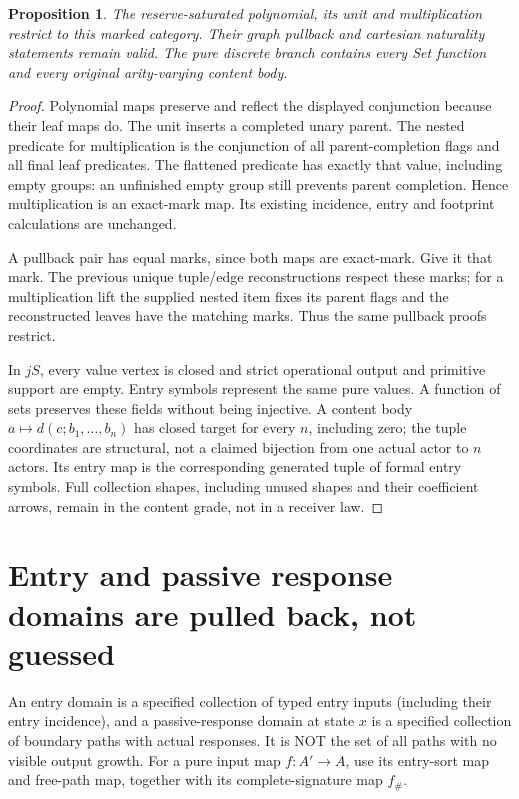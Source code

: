 \documentclass[11pt]{article}
\newtheorem{proposition}{Proposition}
\begin{document}
\begin{proposition}
The reserve-saturated polynomial, its unit and multiplication restrict to this marked category. Their graph pullback and cartesian naturality statements remain valid. The pure discrete branch contains every Set function and every original arity-varying content body.
\end{proposition}
\begin{proof}
Polynomial maps preserve and reflect the displayed conjunction because their leaf maps do. The unit inserts a completed unary parent. The nested predicate for multiplication is the conjunction of all parent-completion flags and all final leaf predicates. The flattened predicate has exactly that value, including empty groups: an unfinished empty group still prevents parent completion. Hence multiplication is an exact-mark map. Its existing incidence, entry and footprint calculations are unchanged.

A pullback pair has equal marks, since both maps are exact-mark. Give it that mark. The previous unique tuple/edge reconstructions respect these marks; for a multiplication lift the supplied nested item fixes its parent flags and the reconstructed leaves have the matching marks. Thus the same pullback proofs restrict.

In $jS$, every value vertex is closed and strict operational output and primitive support are empty. Entry symbols represent the same pure values. A function of sets preserves these fields without being injective. A content body $a\mapsto d(c;b_1,\ldots,b_n)$ has closed target for every $n$, including zero; the tuple coordinates are structural, not a claimed bijection from one actual actor to $n$ actors. Its entry map is the corresponding generated tuple of formal entry symbols. Full collection shapes, including unused shapes and their coefficient arrows, remain in the content grade, not in a receiver law.\end{proof}

\section{Entry and passive response domains are pulled back, not guessed}
An entry domain is a specified collection of typed entry inputs (including their entry incidence), and a passive-response domain at state $x$ is a specified collection of boundary paths with actual responses. It is NOT the set of all paths with no visible output growth. For a pure input map $f:A'\to A$, use its entry-sort map and free-path map, together with its complete-signature map $f_\#$.
\end{document}

